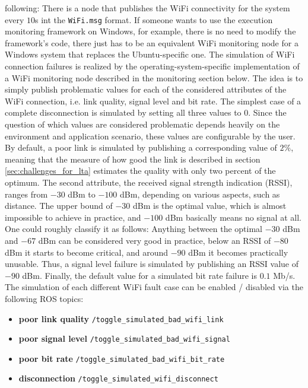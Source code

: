\documentclass[english, master, utf8]{base/thesis_KBS}
\newcommand{\code}[1]{\colorbox{light-gray}{\texttt{#1}}}
\begin{document}
following: There is a node that publishes the WiFi connectivity for the system every $10$s int the \code{WiFi.msg} format. If someone wants to use the execution monitoring
framework on Windows, for example, there is no need to modify the framework's code, there just has to be an equivalent WiFi monitoring node for a Windows system that replaces
the Ubuntu-specific one.\newline
The simulation of WiFi connection failures is realized by the operating-system-specific implementation of a WiFi monitoring node described in the monitoring section
below. The idea is to simply publish problematic values for each of the considered attributes of the WiFi connection,
i.e. link quality, signal level and bit rate. The simplest case of a complete disconnection is simulated by setting all three values to $0$.
Since the question of which values are considered problematic depends heavily on the environment and application scenario, these values are configurable by the user.
By default, a poor link is simulated by publishing a corresponding value of $2\%$, meaning that the measure of how good the link is described in section
\ref{sec:challenges_for_lta} estimates the quality with only two percent of the optimum. The second attribute, the received signal strength indication (RSSI),
ranges from $-30$ dBm to $-100$ dBm, depending on various aspects, such as distance. \cite{Heurtefeux:2012} The upper bound of $-30$ dBm is the optimal value, which
is almost impossible to achieve in practice, and $-100$ dBm basically means no signal at all. One could roughly classify it as follows: Anything between the optimal
$-30$ dBm and $-67$ dBm can be considered very good in practice, below an RSSI of $-80$ dBm it starts to become critical, and around $-90$ dBm it becomes practically 
unusable. \cite{metageek} Thus, a signal level failure is simulated by publishing an RSSI value of $-90$ dBm. Finally, the default value for a simulated bit rate failure 
is $0.1$ Mb/s. The simulation of each different WiFi fault case can be enabled / disabled via the following ROS topics:
\begin{itemize}
    \item \textbf{poor link quality} \textrightarrow \code{/toggle\_simulated\_bad\_wifi\_link}
    \item \textbf{poor signal level} \textrightarrow \code{/toggle\_simulated\_bad\_wifi\_signal}
    \item \textbf{poor bit rate} \textrightarrow \code{/toggle\_simulated\_bad\_wifi\_bit\_rate}
    \item \textbf{disconnection} \textrightarrow \code{/toggle\_simulated\_wifi\_disconnect}
\end{itemize}
\end{document}
